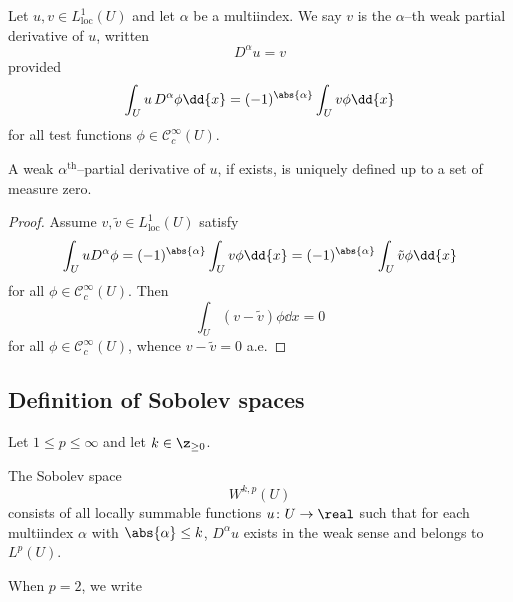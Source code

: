 \begin{definition*}
    Let $u, v \in L_\text{loc}^1(U)$ and let $\alpha$ be a multiindex. We say
    $v$ is the $\alpha$--th weak partial derivative of $u$, written
    \[
        D^\alpha u = v  
    \]
    provided
    \[
        \int_U u \, D^\alpha \phi \dd{x} = 
        (-1)^{\abs{\alpha}} \int_U v \phi \dd{x}
    \]
    for all test functions $\phi \in \mathcal{C}_c^\infty(U)$.
\end{definition*}

\begin{prop}
    A weak $\alpha^\text{th}$--partial derivative of $u$, if exists, is uniquely
    defined up to a set of measure zero.
\end{prop}
\begin{proof}
    Assume $v, \tilde{v} \in L_\text{loc}^1(U)$ satisfy
    \[
        \int_U u D^\alpha \phi =
        (-1)^{\abs{\alpha}} \int_U v \phi \dd{x} =  
        (-1)^{\abs{\alpha}} \int_U \tilde{v} \phi \dd{x}
    \]
    for all $\phi \in \mathcal{C}_c^\infty(U)$. Then
    \[
        \int_U (v - \tilde{v}) \phi \dd{x} = 0  
    \]
    for all $\phi \in \mathcal{C}_c^\infty(U)$, whence $v - \tilde{v} = 0$ a.e.
\end{proof}

\subsection{Definition of Sobolev spaces}

Let $1 \leq p \leq \infty$ and let $k \in \z_{\geq 0}$.

\begin{definition*}
    The Sobolev space
    \[
        W^{k,p}(U)  
    \]
    consists of all locally summable functions $u \colon U \rightarrow \real$
    such that for each multiindex $\alpha$ with $\abs{\alpha} \leq k$, $D^\alpha
    u$ exists in the weak sense and belongs to $L^p(U)$.
\end{definition*}

When $p = 2$, we write 